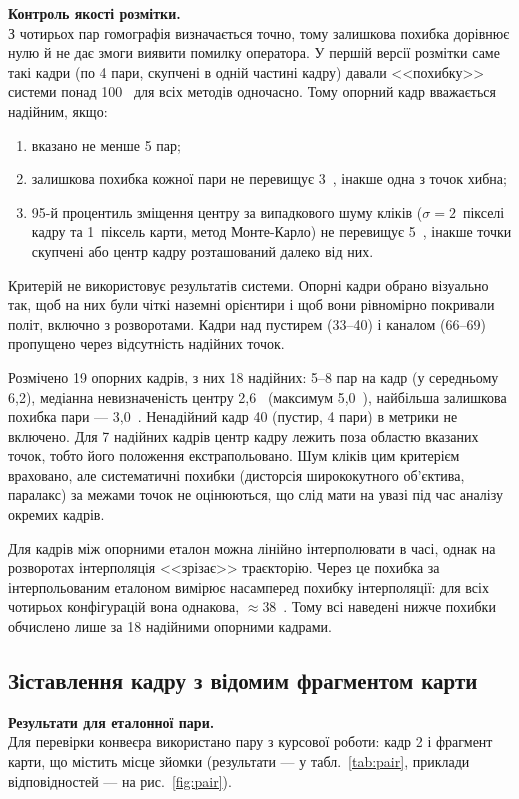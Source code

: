 \documentclass[a4paper, 12pt, titlepage]{article}
\begin{document}
\textbf{Контроль якості розмітки.}\\
З чотирьох пар гомографія визначається точно, тому залишкова похибка дорівнює нулю й не дає змоги виявити помилку оператора. У першій версії розмітки саме такі кадри (по 4 пари, скупчені в одній частині кадру) давали <<похибку>> системи понад 100~\px{} для всіх методів одночасно. Тому опорний кадр вважається надійним, якщо:
\begin{enumerate}
    \item вказано не менше 5 пар;
    \item залишкова похибка кожної пари не перевищує 3~\px{}, інакше одна з точок хибна;
    \item 95-й процентиль зміщення центру за випадкового шуму кліків ($\sigma = 2$~пікселі кадру та 1~піксель карти, метод Монте-Карло) не перевищує 5~\px{}, інакше точки скупчені або центр кадру розташований далеко від них.
\end{enumerate}
Критерій не використовує результатів системи. Опорні кадри обрано візуально так, щоб на них були чіткі наземні орієнтири і щоб вони рівномірно покривали політ, включно з розворотами. Кадри над пустирем (33--40) і каналом (66--69) пропущено через відсутність надійних точок.

Розмічено 19 опорних кадрів, з них 18 надійних: 5--8 пар на кадр (у середньому 6,2), медіанна невизначеність центру 2,6~\px{} (максимум 5,0~\px{}), найбільша залишкова похибка пари --- 3,0~\px{}. Ненадійний кадр 40 (пустир, 4 пари) в метрики не включено. Для 7 надійних кадрів центр кадру лежить поза областю вказаних точок, тобто його положення екстрапольовано. Шум кліків цим критерієм враховано, але систематичні похибки (дисторсія ширококутного об'єктива, паралакс) за межами точок не оцінюються, що слід мати на увазі під час аналізу окремих кадрів.

Для кадрів між опорними еталон можна лінійно інтерполювати в часі, однак на розворотах інтерполяція <<зрізає>> траєкторію. Через це похибка за інтерпольованим еталоном вимірює насамперед похибку інтерполяції: для всіх чотирьох конфігурацій вона однакова, $\approx 38$~\px{}. Тому всі наведені нижче похибки обчислено лише за 18 надійними опорними кадрами.

\subsection{Зіставлення кадру з відомим фрагментом карти}
\label{sec:exp-pair}

\textbf{Результати для еталонної пари.}\\
Для перевірки конвеєра використано пару з курсової роботи: кадр 2 і фрагмент карти, що містить місце зйомки (результати --- у табл.~\ref{tab:pair}, приклади відповідностей --- на рис.~\ref{fig:pair}).
\end{document}
